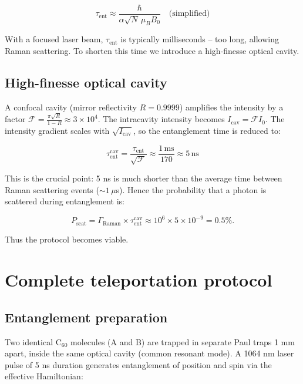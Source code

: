 \documentclass[12pt,a4paper]{article}
\begin{document}
\begin{equation}
\tau_{\text{ent}} \approx \frac{\hbar}{\alpha \sqrt{N} \,\mu_B B_0} \quad \text{(simplified)}
\end{equation}

With a focused laser beam, $\tau_{\text{ent}}$ is typically milliseconds – too long, allowing Raman scattering. To shorten this time we introduce a high-finesse optical cavity.

\subsection{High-finesse optical cavity}
A confocal cavity (mirror reflectivity $R=0.9999$) amplifies the intensity by a factor $\mathcal{F} = \frac{\pi\sqrt{R}}{1-R} \approx 3\times10^4$. The intracavity intensity becomes $I_{\text{cav}} = \mathcal{F} I_0$. The intensity gradient scales with $\sqrt{I_{\text{cav}}}$, so the entanglement time is reduced to:

\begin{equation}
\tau_{\text{ent}}^{\text{cav}} = \frac{\tau_{\text{ent}}}{\sqrt{\mathcal{F}}} \approx \frac{1\,\text{ms}}{170} \approx 5\,\text{ns}
\end{equation}

This is the crucial point: 5 ns is much shorter than the average time between Raman scattering events ($\sim1\,\mu$s). Hence the probability that a photon is scattered during entanglement is:

\begin{equation}
P_{\text{scat}} = \Gamma_{\text{Raman}} \times \tau_{\text{ent}}^{\text{cav}} \approx 10^6 \times 5\times10^{-9} = 0.5\%.
\end{equation}

Thus the protocol becomes viable.

\section{Complete teleportation protocol}

\subsection{Entanglement preparation}
Two identical C$_{60}$ molecules (A and B) are trapped in separate Paul traps 1 mm apart, inside the same optical cavity (common resonant mode). A 1064 nm laser pulse of 5 ns duration generates entanglement of position and spin via the effective Hamiltonian:
\end{document}
